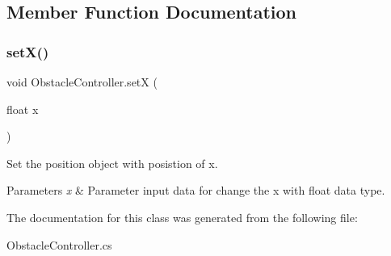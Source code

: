 \subsection{Member Function Documentation}
\hypertarget{class_obstacle_controller_a74a4fcc11a02b51cf45c15a90e089e1a}{}\label{class_obstacle_controller_a74a4fcc11a02b51cf45c15a90e089e1a} 
\subsubsection{\texorpdfstring{set\+X()}{setX()}}
{\footnotesize\ttfamily void Obstacle\+Controller.\+setX (\begin{DoxyParamCaption}\item[{float}]{x }\end{DoxyParamCaption})}



Set the position object with posistion of x. 


\begin{DoxyParams}{Parameters}
{\em x} & Parameter input data for change the x with float data type.\\
\hline
\end{DoxyParams}


The documentation for this class was generated from the following file\+:\begin{DoxyCompactItemize}
\item 
Obstacle\+Controller.\+cs\end{DoxyCompactItemize}
